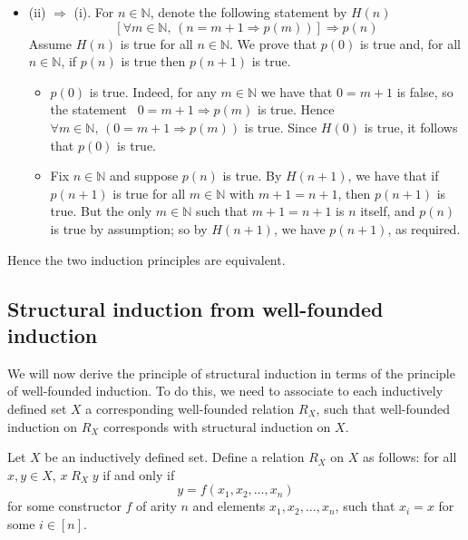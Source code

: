 \begin{example}
\begin{itemize}
\item (ii) $\Rightarrow$ (i). For $n \in \mathbb{N}$, denote the following statement by $H(n)$
\[ [\forall m \in \mathbb{N},\, (n=m+1 \Rightarrow p(m))] \Rightarrow p(n) \]
Assume $H(n)$ is true for all $n \in \mathbb{N}$. We prove that $p(0)$ is true and, for all $n \in \mathbb{N}$, if $p(n)$ is true then $p(n+1)$ is true.
\begin{itemize}
\item $p(0)$ is true. Indeed, for any $m \in \mathbb{N}$ we have that $0=m+1$ is false, so the statement ~$0=m+1 \Rightarrow p(m)$ is true. Hence $\forall m \in \mathbb{N},\, (0=m+1 \Rightarrow p(m))$ is true. Since $H(0)$ is true, it follows that $p(0)$ is true.
\item Fix $n \in \mathbb{N}$ and suppose $p(n)$ is true. By $H(n+1)$, we have that if $p(n+1)$ is true for all $m \in \mathbb{N}$ with $m+1=n+1$, then $p(n+1)$ is true. But the only $m \in \mathbb{N}$ such that $m+1=n+1$ is $n$ itself, and $p(n)$ is true by assumption; so by $H(n+1)$, we have $p(n+1)$, as required.
\end{itemize}
\end{itemize}

Hence the two induction principles are equivalent.
\end{example}

\begin{example}

\end{example}

\subsection*{Structural induction from well-founded induction}

We will now derive the principle of structural induction in terms of the principle of well-founded induction. To do this, we need to associate to each inductively defined set $X$ a corresponding well-founded relation $R_X$, such that well-founded induction on $R_X$ corresponds with structural induction on $X$.

\begin{definition}
\label{defRX}
Let $X$ be an inductively defined set. Define a relation $R_X$ on $X$ as follows: for all $x,y \in X$, $x\;R_X\;y$ if and only if
\[ y=f(x_1,x_2,\dots,x_n) \]
for some constructor $f$ of arity $n$ and elements $x_1,x_2,\dots,x_n$, such that $x_i=x$ for some $i \in [n]$.
\end{definition}

